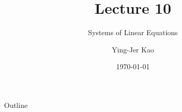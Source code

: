 \documentclass{beamer}
\title[Systems of Linear  Equations] %
{Lecture 10}
\subtitle
{Systems of Linear  Equations} %
\author[Ying-Jer Kao] %
{Ying-Jer Kao}
\institute[National Taiwan University] %
{
  Department of Physics\\
 National Taiwan University
  }
\date[Numerical Analysis and Programming] %
{\today}
\begin{document}
\begin{frame}
  \titlepage
\end{frame}

\begin{frame}{Outline}
  \tableofcontents
\end{frame}



\end{document}
